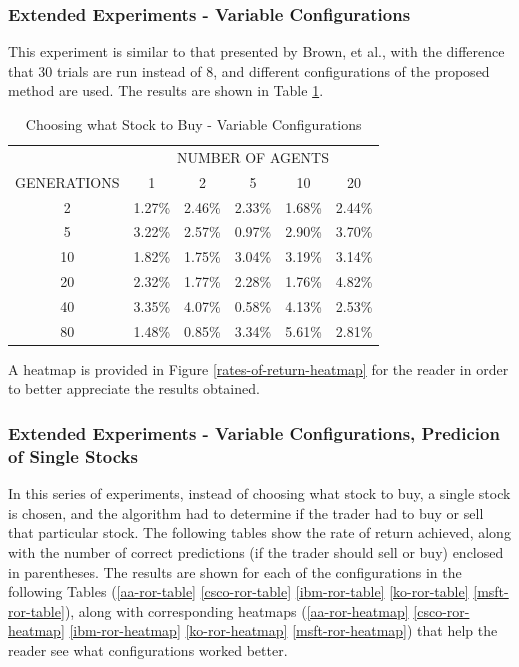 \documentclass[12pt,journal,compsoc]{IEEEtran}
\begin{document}
\subsubsection{Extended Experiments - Variable Configurations}

This experiment is similar to that presented by Brown, et al., with the difference that 30 trials are run instead of 8, and different configurations of the proposed method are used. The results are shown in Table \ref{table-rates-of-return}.

\begin{table}
\caption{{Choosing what Stock to Buy - Variable Configurations}}
\label{table-rates-of-return}
    \begin{tabular}{ c c c c c c }
         & \multicolumn{5}{c}{NUMBER OF AGENTS} \\ 
        GENERATIONS & 1      & 2      & 5      & 10     & 20     \\
            2       & 1.27\% & 2.46\% & 2.33\% & 1.68\% & 2.44\% \\ 
            5       & 3.22\% & 2.57\% & 0.97\% & 2.90\% & 3.70\% \\ 
            10      & 1.82\% & 1.75\% & 3.04\% & 3.19\% & 3.14\% \\ 
            20      & 2.32\% & 1.77\% & 2.28\% & 1.76\% & 4.82\% \\ 
            40      & 3.35\% & 4.07\% & 0.58\% & 4.13\% & 2.53\% \\ 
            80      & 1.48\% & 0.85\% & 3.34\% & 5.61\% & 2.81\% \\ 
    \end{tabular} 
\end{table}

A heatmap is provided in Figure \ref{rates-of-return-heatmap} for the reader in order to better appreciate the results obtained.

\subsubsection{Extended Experiments - Variable Configurations, Predicion of Single Stocks}

In this series of experiments, instead of choosing what stock to buy, a single stock is chosen, and the algorithm had to determine if the trader had to buy or sell that particular stock. The following tables show the rate of return achieved, along with the number of correct predictions (if the trader should sell or buy) enclosed in parentheses. The results are shown for each of the configurations in the following Tables (\ref{aa-ror-table} \ref{csco-ror-table} \ref{ibm-ror-table} \ref{ko-ror-table} \ref{msft-ror-table}), along with corresponding heatmaps (\ref{aa-ror-heatmap} \ref{csco-ror-heatmap} \ref{ibm-ror-heatmap} \ref{ko-ror-heatmap} \ref{msft-ror-heatmap}) that help the reader see what configurations worked better.
\end{document}

